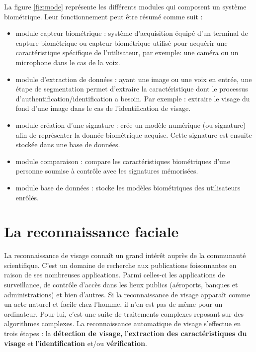 La figure \ref{fig:mode} représente les différents modules qui composent un système biométrique. Leur fonctionnement peut être résumé comme suit :
\begin{itemize}
	\item module capteur biométrique : système d'acquisition équipé d'un terminal de capture biométrique ou capteur biométrique utilisé pour acquérir une caractéristique spécifique de l'utilisateur, par exemple: une caméra ou un microphone dans le cas de la voix.
	\item module d'extraction de données : ayant une image ou une voix en entrée, une étape de segmentation permet d'extraire la caractéristique dont le processus d'authentification/identification a besoin. Par exemple : extraire le visage du fond d'une image dans le cas de l'identification de visage.
	\item module création d'une signature : crée un modèle numérique (ou signature) afin de représenter la 
donnée biométrique acquise. Cette signature est ensuite stockée dans une base de données.
  \item module  comparaison : compare les caractéristiques biométriques d'une personne soumise à contrôle avec les signatures mémorisées.
	\item module base de données : stocke les modèles biométriques des utilisateurs enrôlés.
\end{itemize}



\section{La reconnaissance faciale}
La reconnaissance de visage connaît un grand intérêt auprès de la communauté scientifique. C'est un domaine de recherche aux publications foisonnantes en raison de ses nombreuses applications. Parmi celles-ci les applications de surveillance, de contrôle d'accès dans les lieux publics (aéroports, banques et administrations) et bien d'autres.
Si la reconnaissance de visage apparaît comme un acte naturel et facile chez l'homme, il n'en est pas de même pour un ordinateur. Pour lui, c'est une suite de traitements complexes reposant sur des algorithmes complexes. La reconnaissance automatique de visage s'effectue en trois étapes : la \textbf{détection de visage,} l'\textbf{extraction des caractéristiques du visage} et l'\textbf{identification} et/ou \textbf{vérification}. 


